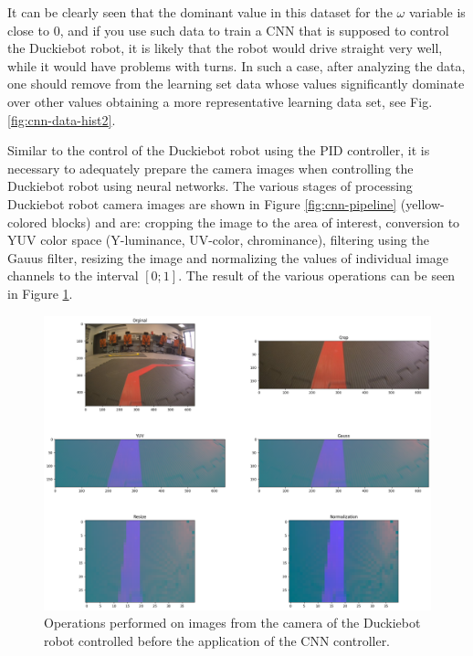 \documentclass[conference]{IEEEtran}
\begin{document}
It can be clearly seen that the dominant value in this dataset for the $\omega$ variable is close to $0$, and if you use such data to train a CNN that is supposed to control the Duckiebot robot, it is likely that the robot would drive straight very well, while it would have problems with turns. In such a case, after analyzing the data, one should remove from the learning set data whose values significantly dominate over other values obtaining a more representative learning data set, see Fig. \ref{fig:cnn-data-hist2}.

Similar to the control of the Duckiebot robot using the PID controller, it is necessary to adequately prepare the camera images when controlling the Duckiebot robot using neural networks. The various stages of processing Duckiebot robot camera images are shown in Figure \ref{fig:cnn-pipeline} (yellow-colored blocks) and are: cropping the image to the area of interest, conversion to YUV color space (Y-luminance, UV-color, chrominance), filtering using the Gauus filter, resizing the image and normalizing the values of individual image channels to the interval $[0;1]$. The result of the various operations can be seen in Figure \ref{fig:cnn-image-prepare}.

\begin{figure}[h]
    \centering
    \includegraphics[width=.95\columnwidth]{nn_prepare_image}
    \caption{Operations performed on images from the camera of the Duckiebot robot controlled before the application of the CNN controller.}
    \label{fig:cnn-image-prepare}
\end{figure}

\end{document}
